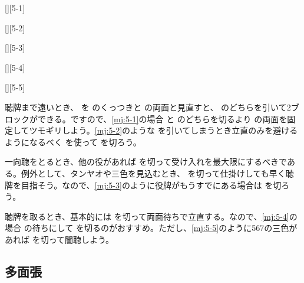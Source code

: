 \documentclass[10pt, twocolumn]{article}
\begin{document}
[][5-1]

[][5-2]

[][5-3]

[][5-4]

[][5-5]

聴牌まで遠いとき、 を のくっつきと  の両面と見直すと、 のどちらを引いて2ブロックができる。ですので、\ref{mj:5-1}の場合  と  のどちらを切るより  の両面を固定してツモギリしよう。\ref{mj:5-2}のような  を引いてしまうとき立直のみを避けるようになるべく  を使って  を切ろう\citep{yuusee-578}。

一向聴をとるとき、他の役があれば  を切って受け入れを最大限にするべきである。例外として、タンヤオや三色を見込むとき、 を切って仕掛けしても早く聴牌を目指そう。なので、\ref{mj:5-3}のように役牌がもうすでにある場合は  を切ろう。

聴牌を取るとき、基本的には  を切って両面待ちで立直する。なので、\ref{mj:5-4}の場合  の待ちにして  を切るのがおすすめ。ただし、\ref{mj:5-5}のように567の三色があれば  を切って闇聴しよう。

\subsection{多面張} \label{sec:tmc}
\end{document}
